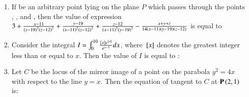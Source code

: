 \documentclass[journal,12pt,onecolumn]{IEEEtran}
\theoremstyle{remark}
\begin{document}
\begin{enumerate}
\hfill{}
\begin{enumerate}
\end{enumerate}

\item If  be an arbitrary point lying on the plane $P$ which passes through the points , , and , then the value of expression $3+\frac{x-11}{\left(y-19\right)^2\left(z-12\right)^2}+\frac{y-19}{\left(x-11\right)^2\left(z-12\right)^2}+\frac{z-12}{\left(x-11\right)^2\left(y-19\right)^2} - \frac{x+y+z}{14\left(x-11\right)\left(y-19\right)\left(z-12\right)}$ is equal to

\hfill{}
\begin{enumerate}
\end{enumerate}

\item Consider the integral $I=\int_{0}^{10}\frac{{}\left[x\right]e^{{}\left[x\right]}}{e^{x-1}}dx$, where ${}\left[x\right]$ denotes the greatest integer less than or equal to $x$. Then the value of $I$ is equal to :

\hfill{}
\begin{enumerate}
\end{enumerate}

\item Let $C$ be the locus of the mirror image of a point on the parabola $y^2=4x$ with respect to the line $y=x$. Then the equation of tangent to $C$ at $\mathbf{P}\left(2,1\right)$ is:


\end{enumerate}
\end{document}
